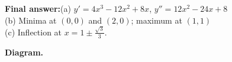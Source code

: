 \documentclass[11pt]{article}
\begin{document}
\begin{answerbox}
\textbf{Final answer:}\quad (a) \(\displaystyle  y' = 4x^3 - 12x^2 + 8x \), \(\displaystyle  y'' = 12x^2 - 24x + 8 \) \\[3pt]  (b) Minima at \(\displaystyle  (0, 0) \) and \(\displaystyle  (2, 0) \); maximum at \(\displaystyle  (1, 1) \) \\[3pt]  (c) Inflection at \(\displaystyle  x = 1 \pm \tfrac{\sqrt{3}}{3} \).
\end{answerbox}
\textbf{Diagram.}

\begin{center}
\end{center}
\end{document}
